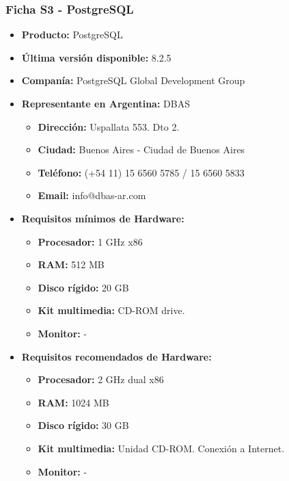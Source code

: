 \subsubsection{Ficha S3 - PostgreSQL}

\begin{itemize}
  \item \textbf{Producto:} PostgreSQL
  \item \textbf{Última versión disponible:} 8.2.5
  \item \textbf{Companía:} PostgreSQL Global Development Group

  \item \textbf{Representante en Argentina:} DBAS
    \begin{itemize}
      \item \textbf{Dirección:} Uspallata 553. Dto 2.
      \item \textbf{Ciudad:} Buenos Aires - Ciudad de Buenos Aires
      \item \textbf{Teléfono:} (+54 11) 15 6560 5785 / 15 6560 5833
      \item \textbf{Email:} info@dbas-ar.com
    \end{itemize}

  \item \textbf{Requisitos mínimos de Hardware:}
    \begin{itemize}
      \item \textbf{Procesador:} 1 GHz x86
      \item \textbf{RAM:} 512 MB
      \item \textbf{Disco rígido:} 20 GB
      \item \textbf{Kit multimedia:} CD-ROM drive.
      \item \textbf{Monitor:} - 
    \end{itemize}

  \item \textbf{Requisitos recomendados de Hardware:}
    \begin{itemize}
      \item \textbf{Procesador:} 2 GHz dual x86
      \item \textbf{RAM:} 1024 MB
      \item \textbf{Disco rígido:} 30 GB
      \item \textbf{Kit multimedia:} Unidad CD-ROM. Conexión a Internet.
      \item \textbf{Monitor:} - 
    \end{itemize}


\end{itemize}

